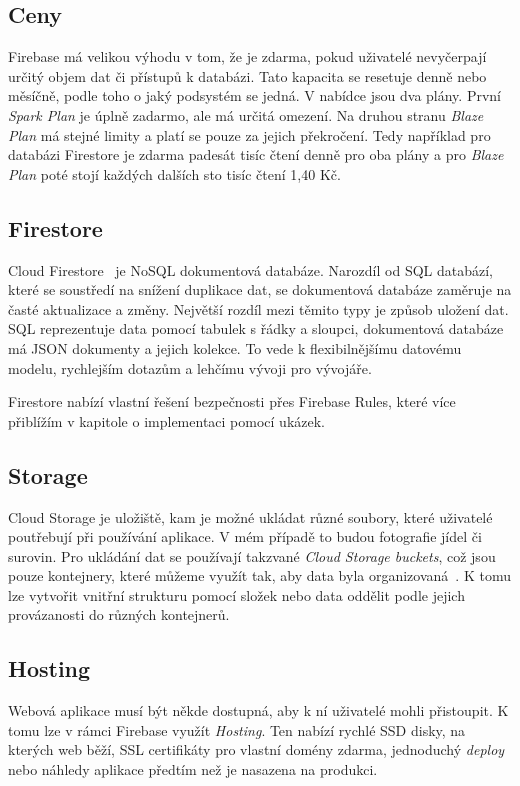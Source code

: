 \subsection{Ceny}
Firebase má velikou výhodu v tom, že je zdarma, pokud uživatelé nevyčerpají určitý objem dat či přístupů k databázi. Tato kapacita se resetuje
denně nebo měsíčně, podle toho o jaký podsystém se jedná. V nabídce jsou dva plány. První \emph{Spark Plan} je úplně zadarmo, ale má určitá omezení.
Na druhou stranu \emph{Blaze Plan} má stejné limity a platí se pouze za jejich překročení. Tedy například pro databázi Firestore je zdarma padesát tisíc
čtení denně pro oba plány a pro \emph{Blaze Plan} poté stojí každých dalších sto tisíc čtení 1,40 Kč.~\cite{FirebasePricing}

\subsection{Firestore}
Cloud Firestore~\cite{Firestore} je NoSQL dokumentová databáze. Narozdíl od SQL databází, které se soustředí na snížení duplikace dat, se dokumentová
databáze zaměruje na časté aktualizace a změny. Největší rozdíl mezi těmito typy je způsob uložení dat. SQL reprezentuje data pomocí
tabulek s řádky a sloupci, dokumentová databáze má JSON dokumenty a jejich kolekce. To vede k flexibilnějšímu datovému modelu, rychlejším
dotazům a lehčímu vývoji pro vývojáře.~\cite{MongoDBNoSQL}

Firestore nabízí vlastní řešení bezpečnosti přes Firebase Rules, které více přiblížím v kapitole o implementaci pomocí ukázek.

\subsection{Storage}
Cloud Storage je uložiště, kam je možné ukládat různé soubory, které uživatelé poutřebují při používání aplikace. V mém případě to
budou fotografie jídel či surovin. Pro ukládání dat se používají takzvané \emph{Cloud Storage buckets}, což jsou pouze kontejnery,
které můžeme využít tak, aby data byla organizovaná~\cite{FirebaseBucket}. K tomu lze vytvořit vnitřní strukturu pomocí složek nebo
data oddělit podle jejich provázanosti do různých kontejnerů.

\subsection{Hosting}
Webová aplikace musí být někde dostupná, aby k ní uživatelé mohli přistoupit. K tomu lze v rámci Firebase využít \emph{Hosting}.
Ten nabízí rychlé SSD disky, na kterých web běží, SSL certifikáty pro vlastní domény zdarma, jednoduchý \emph{deploy} nebo náhledy
aplikace předtím než je nasazena na produkci.~\cite{FirebaseHosting}

